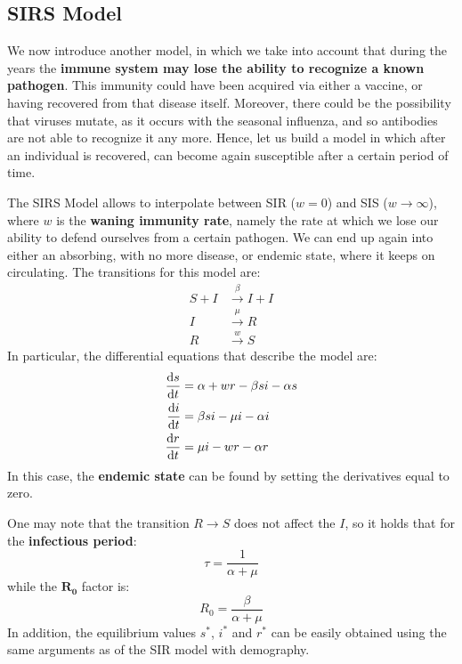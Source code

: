 \documentclass[../main/main.tex]{subfiles}
\begin{document}


\subsection{SIRS Model}
We now introduce another model, in which we take into account that during the years the \textbf{immune system may lose the ability to recognize a known pathogen}. This immunity could have been acquired via either a vaccine, or having recovered from that disease itself. Moreover, there could be the possibility that viruses mutate, as it occurs with the seasonal influenza, and so antibodies are not able to recognize it any more. Hence, let us build a model in which after an individual is recovered, can become again susceptible after a certain period of time.

The SIRS Model allows to interpolate between SIR (\( w=0 \)) and SIS (\( w \rightarrow \infty  \)), where $w$ is the \textbf{waning immunity rate}, namely the rate at which we lose our ability to defend ourselves from a certain pathogen. We can end up again into either an absorbing, with no more disease, or endemic state, where it keeps on circulating.
The transitions for this model are:
\begin{equation}
\begin{split}
 S + I &\overset{\beta }{\rightarrow } I + I   \\
 I & \overset{\mu }{\rightarrow } R  \\
 R & \overset{w}{\rightarrow } S
\end{split}
\end{equation}
In particular, the differential equations that describe the model are:
\begin{equation}
  \begin{split}
    \dv{s}{t} &= \alpha + w r - \beta  s i - \alpha s \\
  \dv{i}{t} &= \beta s i - \mu i - \alpha i \\
  \dv{r}{t} &= \mu i - w r - \alpha r
\end{split}
\end{equation}
In this case, the \textbf{endemic state} can be found by setting the derivatives equal to zero.

One may note that the transition \( R \rightarrow S \) does not affect the \( I \), so it holds that for the \textbf{infectious period}:
\begin{equation}
  \tau = \frac{1}{\alpha + \mu }
\end{equation}
while the $ \mathbf{R_0} $ factor is:
\begin{equation}
  R_0 = \frac{\beta }{\alpha + \mu }
\end{equation}
In addition, the equilibrium values \( s^* \), \( i^* \) and \( r^* \) can be easily obtained using the same arguments as of the SIR model with demography.
\end{document}
